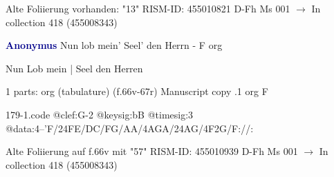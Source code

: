 \documentclass[twocolumn]{book}
\begin{document}
\newline Alte Foliierung vorhanden: "13"
\newline RISM-ID: 455010821
\newline D-Fh  Ms 001
\newline $\rightarrow$ In collection 418 (455008343)
      
\newline \par \vspace{7pt} \textcolor{darkblue}{\textbf{Anonymus  }}
\newline Nun lob mein' Seel' den Herrn - F
\newline org
\newline \begin{itshape}[f.66v, at left:] Nun Lob mein | Seel den Herren\end{itshape} 
\newline \textcolor{darkblue}{}  1 parts: org (tabulature)  (f.66v-67r)
\newline Manuscript copy
.1  org  F  
\begin{filecontents*}{179-1.code}
@clef:G-2
@keysig:bB
@timesig:3
@data:4--'F/24FE/DC/FG/AA/4AGA/24AG/4F2G/F://:
\end{filecontents*}
\newline
%

\newline Alte Foliierung auf f.66v mit "57"
\newline RISM-ID: 455010939
\newline D-Fh  Ms 001
\newline $\rightarrow$ In collection 418 (455008343)
      
\end{document}
